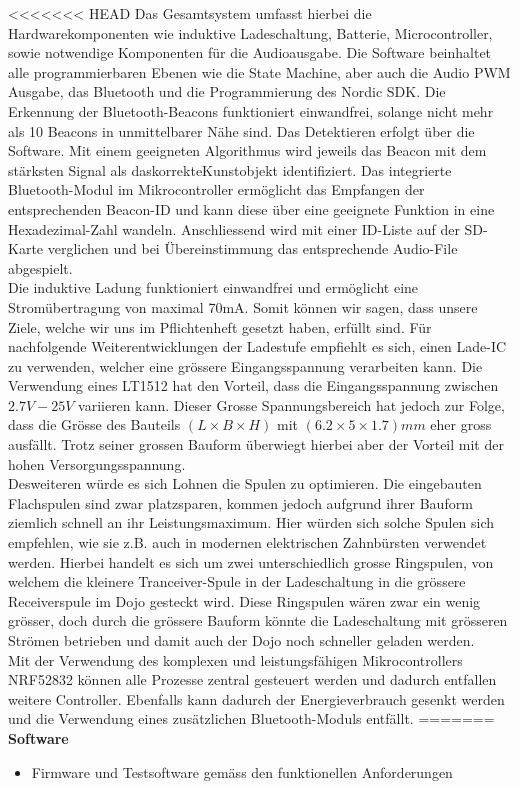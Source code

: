 <<<<<<< HEAD
Das Gesamtsystem umfasst hierbei die Hardwarekomponenten wie induktive Ladeschaltung, Batterie, Microcontroller, sowie notwendige Komponenten für die Audioausgabe. Die Software beinhaltet alle programmierbaren Ebenen wie die State Machine, aber auch die Audio PWM Ausgabe, das Bluetooth und die Programmierung des Nordic SDK.
Die Erkennung der Bluetooth-Beacons funktioniert einwandfrei, solange nicht mehr als 10 Beacons in unmittelbarer Nähe sind. Das Detektieren erfolgt über die Software. Mit einem geeigneten Algorithmus wird jeweils das Beacon mit dem stärksten Signal als das\glqq korrekte\grqq Kunstobjekt identifiziert. Das integrierte Bluetooth-Modul im Mikrocontroller ermöglicht das Empfangen der entsprechenden Beacon-ID und kann diese über eine geeignete Funktion in eine Hexadezimal-Zahl wandeln. Anschliessend wird mit einer ID-Liste auf der SD-Karte verglichen und bei Übereinstimmung das entsprechende Audio-File abgespielt.\\
Die induktive Ladung funktioniert einwandfrei und ermöglicht eine Stromübertragung von maximal 70mA. Somit können wir sagen, dass unsere Ziele, welche wir uns im Pflichtenheft gesetzt haben, erfüllt sind. Für nachfolgende Weiterentwicklungen der Ladestufe empfiehlt es sich, einen Lade-IC zu verwenden, welcher eine grössere Eingangsspannung verarbeiten kann. Die Verwendung eines LT1512 hat den Vorteil, dass die Eingangsspannung zwischen $2.7V - 25V$ variieren kann. Dieser Grosse Spannungsbereich hat jedoch zur Folge, dass die Grösse des Bauteils $(L \times B \times H)$ mit $(6.2\times 5\times 1.7)mm$ eher gross ausfällt. Trotz seiner grossen Bauform überwiegt hierbei aber der Vorteil mit der hohen Versorgungsspannung.\\
Desweiteren würde es sich Lohnen die Spulen zu optimieren. Die eingebauten Flachspulen sind zwar platzsparen, kommen jedoch aufgrund ihrer Bauform ziemlich schnell an ihr Leistungsmaximum. Hier würden sich solche Spulen sich empfehlen, wie sie z.B. auch in modernen elektrischen Zahnbürsten verwendet werden. Hierbei handelt es sich um zwei unterschiedlich grosse Ringspulen, von welchem die kleinere Tranceiver-Spule in der Ladeschaltung in die grössere Receiverspule  im Dojo gesteckt wird. Diese Ringspulen wären zwar ein wenig grösser, doch durch die grössere Bauform könnte die Ladeschaltung mit grösseren Strömen betrieben und damit auch der Dojo noch schneller geladen werden.\\
Mit der Verwendung des komplexen und leistungsfähigen Mikrocontrollers NRF52832 können alle Prozesse zentral gesteuert werden und dadurch entfallen weitere Controller. Ebenfalls kann dadurch der Energieverbrauch gesenkt werden und die Verwendung eines zusätzlichen Bluetooth-Moduls entfällt.
=======
\textbf{Software}
\begin{itemize}
	\item Firmware und Testsoftware gemäss den funktionellen Anforderungen
\end{itemize}
 
